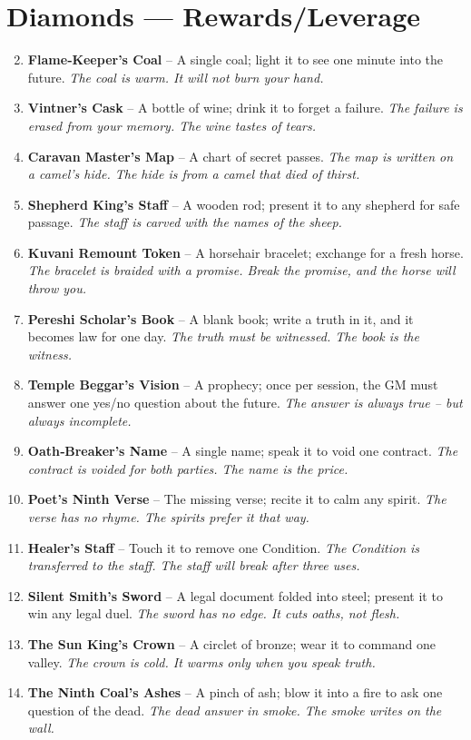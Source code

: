 \documentclass[11pt]{book}
\begin{document}
\section*{Diamonds — Rewards/Leverage}
\begin{enumerate}
\setcounter{enumi}{1}
\item \textbf{Flame‑Keeper’s Coal} – A single coal; light it to see one minute into the future. \textit{The coal is warm. It will not burn your hand.}
\item \textbf{Vintner’s Cask} – A bottle of wine; drink it to forget a failure. \textit{The failure is erased from your memory. The wine tastes of tears.}
\item \textbf{Caravan Master’s Map} – A chart of secret passes. \textit{The map is written on a camel’s hide. The hide is from a camel that died of thirst.}
\item \textbf{Shepherd King’s Staff} – A wooden rod; present it to any shepherd for safe passage. \textit{The staff is carved with the names of the sheep.}
\item \textbf{Kuvani Remount Token} – A horsehair bracelet; exchange for a fresh horse. \textit{The bracelet is braided with a promise. Break the promise, and the horse will throw you.}
\item \textbf{Pereshi Scholar’s Book} – A blank book; write a truth in it, and it becomes law for one day. \textit{The truth must be witnessed. The book is the witness.}
\item \textbf{Temple Beggar’s Vision} – A prophecy; once per session, the GM must answer one yes/no question about the future. \textit{The answer is always true – but always incomplete.}
\item \textbf{Oath‑Breaker’s Name} – A single name; speak it to void one contract. \textit{The contract is voided for both parties. The name is the price.}
\item \textbf{Poet’s Ninth Verse} – The missing verse; recite it to calm any spirit. \textit{The verse has no rhyme. The spirits prefer it that way.}
\item[J] \textbf{Healer’s Staff} – Touch it to remove one Condition. \textit{The Condition is transferred to the staff. The staff will break after three uses.}
\item[Q] \textbf{Silent Smith’s Sword} – A legal document folded into steel; present it to win any legal duel. \textit{The sword has no edge. It cuts oaths, not flesh.}
\item[K] \textbf{The Sun King’s Crown} – A circlet of bronze; wear it to command one valley. \textit{The crown is cold. It warms only when you speak truth.}
\item[A] \textbf{The Ninth Coal’s Ashes} – A pinch of ash; blow it into a fire to ask one question of the dead. \textit{The dead answer in smoke. The smoke writes on the wall.}
\end{enumerate}
\end{document}
